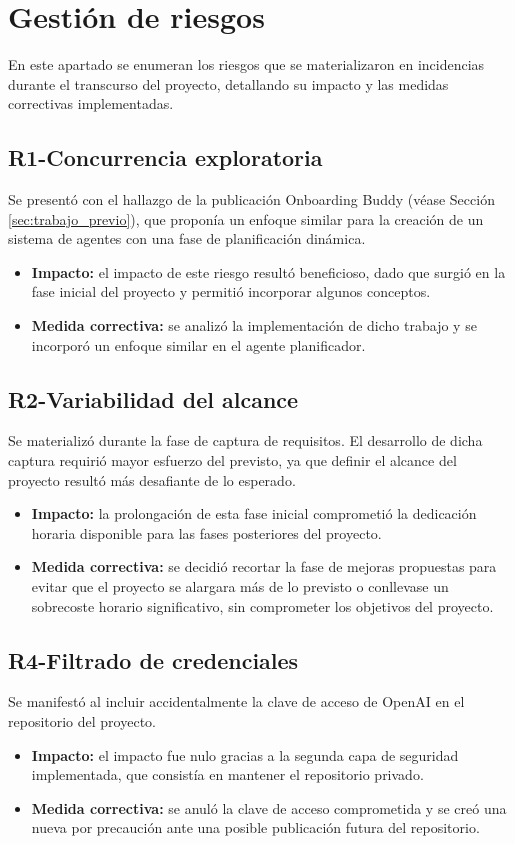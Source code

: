   \section{Gestión de riesgos}
  En este apartado se enumeran los riesgos que se materializaron en incidencias durante el transcurso del proyecto, detallando su impacto y las medidas correctivas implementadas.

  \subsection{R1-Concurrencia exploratoria}
  Se presentó con el hallazgo de la publicación Onboarding Buddy \cite{cristian_ionescu_multi-agent_2025} (véase Sección \ref{sec:trabajo_previo}), que proponía un enfoque similar para la creación de un sistema de agentes con una fase de planificación dinámica.
  \begin{itemize}
    \item\textbf{Impacto: }el impacto de este riesgo resultó beneficioso, dado que surgió en la fase inicial del proyecto y permitió incorporar algunos conceptos.
    \item\textbf{Medida correctiva: }se analizó la implementación de dicho trabajo y se incorporó un enfoque similar en el agente planificador.
  \end{itemize}

  \subsection{R2-Variabilidad del alcance}
Se materializó durante la fase de captura de requisitos. El desarrollo de dicha captura requirió mayor esfuerzo del previsto, ya que definir el alcance del proyecto resultó más desafiante de lo esperado.
  \begin{itemize}
  \item\textbf{Impacto: }la prolongación de esta fase inicial comprometió la dedicación horaria disponible para las fases posteriores del proyecto.
    \item\textbf{Medida correctiva: }se decidió recortar la fase de mejoras propuestas para evitar que el proyecto se alargara más de lo previsto o conllevase un sobrecoste horario significativo, sin comprometer los objetivos del proyecto.   
  \end{itemize}

  \subsection{R4-Filtrado de credenciales}
  Se manifestó al incluir accidentalmente la clave de acceso de OpenAI en el repositorio del proyecto.
  \begin{itemize}
  \item\textbf{Impacto: }el impacto fue nulo gracias a la segunda capa de seguridad implementada, que consistía en mantener el repositorio privado.
  \item\textbf{Medida correctiva: }se anuló la clave de acceso comprometida y se creó una nueva por precaución ante una posible publicación futura del repositorio.
  \end{itemize}
